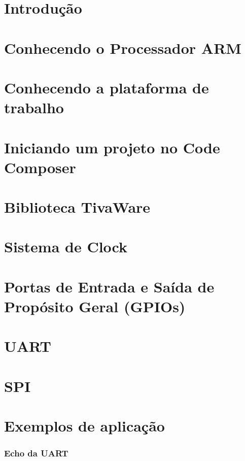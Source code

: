 \documentclass[a4paper,10pt]{book}
\begin{document}
\maketitle

\chapter{Introdução}


\chapter{Conhecendo o Processador ARM}


\chapter{Conhecendo a plataforma de trabalho}


\chapter{Iniciando um projeto no Code Composer}


\chapter{Biblioteca TivaWare}


\chapter{Sistema de Clock}


\chapter{Portas de Entrada e Saída de Propósito Geral (GPIOs)}


\chapter{UART}


\chapter{SPI}


\chapter{Exemplos de aplicação}

\subsection{Echo da UART}





\end{document}
